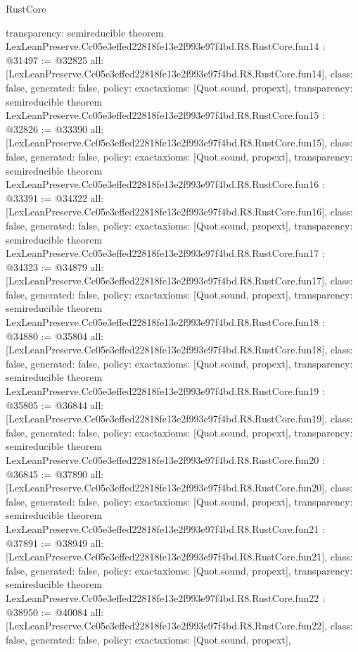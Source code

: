 \begin{lexlean}{RustCore}
\begin{coremodule}
{  transparency: semireducible
}
theorem LexLeanPreserve.Cc05e3effed22818fe13e2f993e97f4bd.R8.RustCore.fun14 : @31497 := @32825 {
  all: [LexLeanPreserve.Cc05e3effed22818fe13e2f993e97f4bd.R8.RustCore.fun14],
  class: false,
  generated: false,
  policy: exact{axioms: [Quot.sound, propext]},
  transparency: semireducible
}
theorem LexLeanPreserve.Cc05e3effed22818fe13e2f993e97f4bd.R8.RustCore.fun15 : @32826 := @33390 {
  all: [LexLeanPreserve.Cc05e3effed22818fe13e2f993e97f4bd.R8.RustCore.fun15],
  class: false,
  generated: false,
  policy: exact{axioms: [Quot.sound, propext]},
  transparency: semireducible
}
theorem LexLeanPreserve.Cc05e3effed22818fe13e2f993e97f4bd.R8.RustCore.fun16 : @33391 := @34322 {
  all: [LexLeanPreserve.Cc05e3effed22818fe13e2f993e97f4bd.R8.RustCore.fun16],
  class: false,
  generated: false,
  policy: exact{axioms: [Quot.sound, propext]},
  transparency: semireducible
}
theorem LexLeanPreserve.Cc05e3effed22818fe13e2f993e97f4bd.R8.RustCore.fun17 : @34323 := @34879 {
  all: [LexLeanPreserve.Cc05e3effed22818fe13e2f993e97f4bd.R8.RustCore.fun17],
  class: false,
  generated: false,
  policy: exact{axioms: [Quot.sound, propext]},
  transparency: semireducible
}
theorem LexLeanPreserve.Cc05e3effed22818fe13e2f993e97f4bd.R8.RustCore.fun18 : @34880 := @35804 {
  all: [LexLeanPreserve.Cc05e3effed22818fe13e2f993e97f4bd.R8.RustCore.fun18],
  class: false,
  generated: false,
  policy: exact{axioms: [Quot.sound, propext]},
  transparency: semireducible
}
theorem LexLeanPreserve.Cc05e3effed22818fe13e2f993e97f4bd.R8.RustCore.fun19 : @35805 := @36844 {
  all: [LexLeanPreserve.Cc05e3effed22818fe13e2f993e97f4bd.R8.RustCore.fun19],
  class: false,
  generated: false,
  policy: exact{axioms: [Quot.sound, propext]},
  transparency: semireducible
}
theorem LexLeanPreserve.Cc05e3effed22818fe13e2f993e97f4bd.R8.RustCore.fun20 : @36845 := @37890 {
  all: [LexLeanPreserve.Cc05e3effed22818fe13e2f993e97f4bd.R8.RustCore.fun20],
  class: false,
  generated: false,
  policy: exact{axioms: [Quot.sound, propext]},
  transparency: semireducible
}
theorem LexLeanPreserve.Cc05e3effed22818fe13e2f993e97f4bd.R8.RustCore.fun21 : @37891 := @38949 {
  all: [LexLeanPreserve.Cc05e3effed22818fe13e2f993e97f4bd.R8.RustCore.fun21],
  class: false,
  generated: false,
  policy: exact{axioms: [Quot.sound, propext]},
  transparency: semireducible
}
theorem LexLeanPreserve.Cc05e3effed22818fe13e2f993e97f4bd.R8.RustCore.fun22 : @38950 := @40084 {
  all: [LexLeanPreserve.Cc05e3effed22818fe13e2f993e97f4bd.R8.RustCore.fun22],
  class: false,
  generated: false,
  policy: exact{axioms: [Quot.sound, propext]},
}
\end{coremodule}
\end{lexlean}

